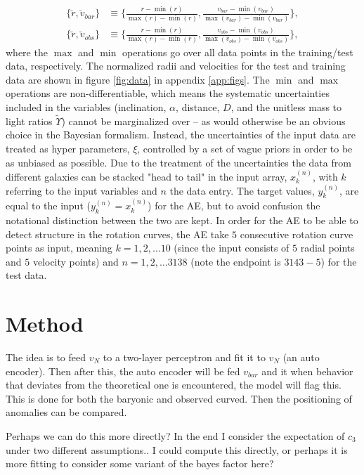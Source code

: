 \begin{example}
	\begin{equation}
		\begin{split}
			\{\breve{r},\breve{v}_{bar}\} &\equiv \bigg\{\frac{r-\min(r)}{\max(r)-\min(r)},\frac{v_{bar}-\min(v_{bar})}{\max(v_{bar})-\min(v_{bar})}\bigg\},\\
			\{\breve{r},\breve{v}_{obs}\} &\equiv \bigg\{\frac{r-\min(r)}{\max(r)-\min(r)},\frac{v_{obs}-\min(v_{obs})}{\max(v_{obs})-\min(v_{obs})}\bigg\},
		\end{split}
	\end{equation}
	where the $\max$ and $\min$ operations go over all data points in the training/test data, respectively. The normalized radii and velocities for the test and training data are shown in figure \ref{fig:data} in appendix \ref{app:figs}. The $\min$ and $\max$ operations are non-differentiable, which means the systematic uncertainties included in the variables (inclination, $\alpha$, distance, $D$, and the unitless mass to light ratios $\tilde{\Upsilon}$) cannot be marginalized over -- as would otherwise be an obvious choice in the Bayesian formalism. Instead, the uncertainties of the input data are treated as hyper parameters, $\xi$, controlled by a set of vague priors in order to be as unbiased as possible. Due to the treatment of the uncertainties the data from different galaxies can be stacked "head to tail" in the input array, $x^{(n)}_k$, with $k$ referring to the input variables and $n$ the data entry. The target values, $y_k^{(n)}$, are equal to the input ($y_k^{(n)}=x_k^{(n)}$) for the AE, but to avoid confusion the notational distinction between the two are kept. In order for the AE to be able to detect structure in the rotation curves, the AE take $5$ consecutive rotation curve points as input, meaning $k=1,2,\dots 10$ (since the input consists of $5$ radial points and $5$ velocity points) and $n=1,2,\dots3138$ (note the endpoint is $3143-5$) for the test data. 
	
	\section{Method}
	The idea is to feed $v_N$ to a two-layer perceptron and fit it to $v_N$ (an auto encoder). Then after this, the auto encoder will be fed $v_{bar}$ and it when behavior that deviates from the theoretical one is encountered, the model will flag this. This is done for both the baryonic and observed curved. Then the positioning of anomalies can be compared.
	
	Perhaps we can do this more directly? In the end I consider the expectation of $c_3$ under two different assumptions.. I could compute this directly, or perhaps it is more fitting to consider some variant of the bayes factor here? 
	

\end{example}

